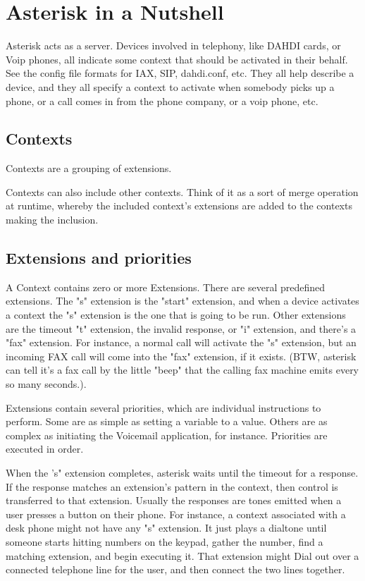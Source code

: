 \section{Asterisk in a Nutshell}

Asterisk acts as a server. Devices involved in telephony, like DAHDI
cards, or Voip phones, all indicate some context that should be
activated in their behalf. See the config file formats for IAX, SIP,
dahdi.conf, etc. They all help describe a device, and they all
specify a context to activate when somebody picks up a phone, or a
call comes in from the phone company, or a voip phone, etc.

\subsection{Contexts}

Contexts are a grouping of extensions.

Contexts can also include other contexts. Think of it as a sort of
merge operation at runtime, whereby the included context's extensions
are added to the contexts making the inclusion.

\subsection{Extensions and priorities}

A Context contains zero or more Extensions. There are several
predefined extensions. The "s" extension is the "start" extension, and
when a device activates a context the "s" extension is the one that is
going to be run. Other extensions are the timeout "t" extension, the
invalid response, or "i" extension, and there's a "fax" extension. For
instance, a normal call will activate the "s" extension, but an
incoming FAX call will come into the "fax" extension, if it
exists. (BTW, asterisk can tell it's a fax call by the little "beep"
that the calling fax machine emits every so many seconds.).

Extensions contain several priorities, which are individual
instructions to perform. Some are as simple as setting a variable to a
value. Others are as complex as initiating the Voicemail application,
for instance. Priorities are executed in order.

When the 's" extension completes, asterisk waits until the timeout for
a response. If the response matches an extension's pattern in the
context, then control is transferred to that extension. Usually the
responses are tones emitted when a user presses a button on their
phone. For instance, a context associated with a desk phone might not
have any "s" extension. It just plays a dialtone until someone starts
hitting numbers on the keypad, gather the number, find a matching
extension, and begin executing it. That extension might Dial out over
a connected telephone line for the user, and then connect the two
lines together.

